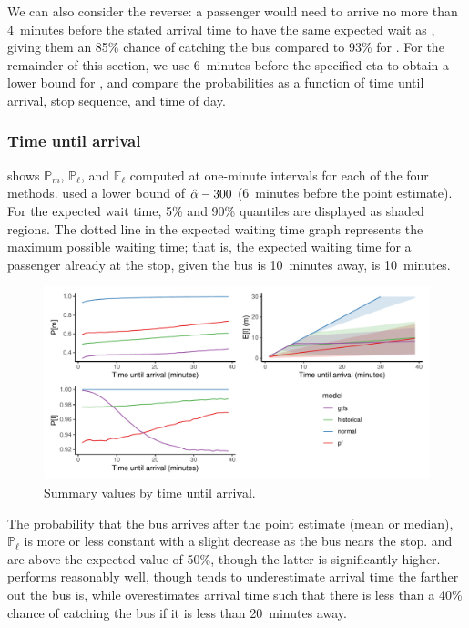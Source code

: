 We can also consider the reverse: a passenger would need to arrive no more than 4~minutes before the stated arrival time to have the same expected wait as \Fpf{}, giving them an 85\% chance of catching the bus compared to 93\% for \Fpf{}. For the remainder of this section, we use 6~minutes before the specified \gls{eta} to obtain a lower bound for \Fsched{}, and compare the probabilities as a function of time until arrival, stop sequence, and time of day.



\subsubsection{Time until arrival}

 shows $\mathbb{P}_m$, $\mathbb{P}_\ell$, and $\mathbb{E}_\ell$ computed at one-minute intervals for each of the four methods. \Fsched{} used a lower bound of $\hat{\alpha} - 300$ (6~minutes before the point estimate). For the expected wait time, 5\% and 90\% quantiles are displayed as shaded regions. The dotted line in the expected waiting time graph represents the maximum possible waiting time; that is, the expected waiting time for a passenger already at the stop, given the bus is 10~minutes away, is 10~minutes.


\begin{knitrout}\small
{}\color{fgcolor}\begin{figure}
\includegraphics[width=\textwidth]{figure/model_results_pr_time-1} \caption[Summary values by time until arrival]{Summary values by time until arrival.}\label{fig:model_results_pr_time}
\end{figure}


\end{knitrout}


The probability that the bus arrives after the point estimate (mean or median), $\mathbb{P}_\ell$ is more or less constant with a slight decrease as the bus nears the stop. \Fpf{} and \Fnorm{} are above the expected value of 50\%, though the latter is significantly higher. \Fnorm{} performs reasonably well, though tends to underestimate arrival time the farther out the bus is, while \Fsched{} overestimates arrival time such that there is less than a 40\% chance of catching the bus if it is less than 20~minutes away.


